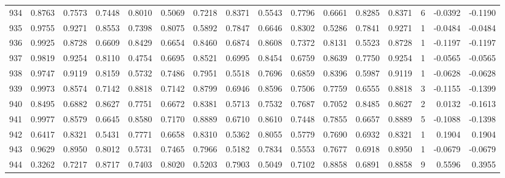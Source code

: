 \begin{tabular}{lrrrrrrrrrrrrrrr}
934 &      0.8763 &  0.7573 &  0.7448 &  0.8010 &  0.5069 &  0.7218 &  0.8371 &  0.5543 &  0.7796 &  0.6661 &   0.8285 &     0.8371 &      6 &                   -0.0392 &                    -0.1190 \\
935 &      0.9755 &  0.9271 &  0.8553 &  0.7398 &  0.8075 &  0.5892 &  0.7847 &  0.6646 &  0.8302 &  0.5286 &   0.7841 &     0.9271 &      1 &                   -0.0484 &                    -0.0484 \\
936 &      0.9925 &  0.8728 &  0.6609 &  0.8429 &  0.6654 &  0.8460 &  0.6874 &  0.8608 &  0.7372 &  0.8131 &   0.5523 &     0.8728 &      1 &                   -0.1197 &                    -0.1197 \\
937 &      0.9819 &  0.9254 &  0.8110 &  0.4754 &  0.6695 &  0.8521 &  0.6995 &  0.8454 &  0.6759 &  0.8639 &   0.7750 &     0.9254 &      1 &                   -0.0565 &                    -0.0565 \\
938 &      0.9747 &  0.9119 &  0.8159 &  0.5732 &  0.7486 &  0.7951 &  0.5518 &  0.7696 &  0.6859 &  0.8396 &   0.5987 &     0.9119 &      1 &                   -0.0628 &                    -0.0628 \\
939 &      0.9973 &  0.8574 &  0.7142 &  0.8818 &  0.7142 &  0.8799 &  0.6946 &  0.8596 &  0.7506 &  0.7759 &   0.6555 &     0.8818 &      3 &                   -0.1155 &                    -0.1399 \\
940 &      0.8495 &  0.6882 &  0.8627 &  0.7751 &  0.6672 &  0.8381 &  0.5713 &  0.7532 &  0.7687 &  0.7052 &   0.8485 &     0.8627 &      2 &                    0.0132 &                    -0.1613 \\
941 &      0.9977 &  0.8579 &  0.6645 &  0.8580 &  0.7170 &  0.8889 &  0.6710 &  0.8610 &  0.7448 &  0.7855 &   0.6657 &     0.8889 &      5 &                   -0.1088 &                    -0.1398 \\
942 &      0.6417 &  0.8321 &  0.5431 &  0.7771 &  0.6658 &  0.8310 &  0.5362 &  0.8055 &  0.5779 &  0.7690 &   0.6932 &     0.8321 &      1 &                    0.1904 &                     0.1904 \\
943 &      0.9629 &  0.8950 &  0.8012 &  0.5731 &  0.7465 &  0.7966 &  0.5182 &  0.7834 &  0.5553 &  0.7677 &   0.6918 &     0.8950 &      1 &                   -0.0679 &                    -0.0679 \\
944 &      0.3262 &  0.7217 &  0.8717 &  0.7403 &  0.8020 &  0.5203 &  0.7903 &  0.5049 &  0.7102 &  0.8858 &   0.6891 &     0.8858 &      9 &                    0.5596 &                     0.3955 \\

\end{tabular}
